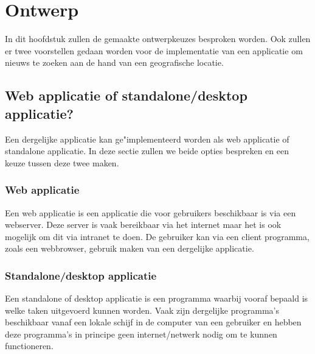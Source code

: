 \documentclass[twoside,openright]{uva-bachelor-thesis}
\begin{document}
\chapter{Ontwerp}
	In dit hoofdstuk zullen de gemaakte ontwerpkeuzes besproken worden. Ook zullen er twee voorstellen gedaan worden voor de implementatie van een applicatie om nieuws te zoeken aan de hand van een geografische locatie.
	\section{Web applicatie of standalone/desktop applicatie?}
		Een dergelijke applicatie kan ge"implementeerd worden als web applicatie of standalone applicatie. In deze sectie zullen we beide opties bespreken en een keuze tussen deze twee maken.
		\subsection{Web applicatie}
			Een web applicatie is een applicatie die voor gebruikers beschikbaar is via een webserver. Deze server is vaak bereikbaar via het internet maar het is ook mogelijk om dit via intranet te doen. De gebruiker kan via een client programma, zoals een webbrowser, gebruik maken van een dergelijke applicatie.
		\subsection{Standalone/desktop applicatie}
			Een standalone of desktop applicatie is een programma waarbij vooraf bepaald is welke taken uitgevoerd kunnen worden. Vaak zijn dergelijke programma's beschikbaar vanaf een lokale schijf in de computer van een gebruiker en hebben deze programma's in principe geen internet/netwerk nodig om te kunnen functioneren.
\end{document}
